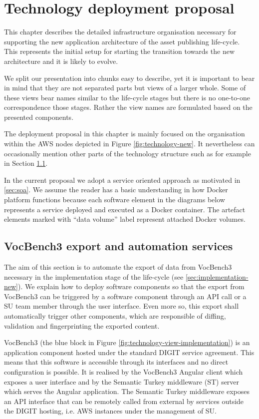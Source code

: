 \chapter{Technology deployment proposal}


	This chapter describes the detailed infrastructure organisation necessary for supporting the new application architecture of the asset publishing life-cycle. This represents the initial setup for starting the transition towards the new architecture and it is likely to evolve. 
	
	We split our presentation into chunks easy to describe, yet it is important to bear in mind that they are not separated parts but views of a larger whole. Some of these views bear names similar to the life-cycle stages but there is no one-to-one correspondence those stages. Rather the view names are formulated based on the presented components.
	
	The deployment proposal in this chapter is mainly focused on the organisation within the AWS nodes depicted in Figure \ref{fig:technology-new}. It nevertheless can occasionally mention other parts of the technology structure such as for example in Section \ref{sec:technology-view-vb3-export}. 
	
	In the current proposal we adopt a service oriented approach as motivated in \ref{sec:soa}. We assume the reader has a basic understanding in how Docker platform \citep{docker} functions because each software element in the diagrams below represents a service deployed and executed as a Docker container. The artefact elements marked with ``data volume'' label represent attached Docker volumes.  

	\section{VocBench3 export and automation services}
	\label{sec:technology-view-vb3-export}
	
	The aim of this section is to automate the export of data from VocBench3 necessary in the implementation stage of the life-cycle (see \ref{sec:implementation-new}).	We explain how to deploy software components so that the export from VocBench3 can be triggered by a software component through an API call or a SU team member through the user interface. Even more so, this export shall automatically trigger other components, which are responsible of diffing, validation and fingerprinting the exported content. 
	
	VocBench3 (the blue block in Figure \ref{fig:technology-view-implementation}) is an application component hosted under the standard DIGIT service agreement. This means that this software is accessible through its interfaces and no direct configuration is possible. It is realised by the VocBench3 Angular client which exposes a user interface and by the Semantic Turkey middleware (ST) server which serves the Angular application. The Semantic Turkey middleware exposes an API interface that can be remotely called from external by services outside the DIGIT hosting, i.e. AWS instances under the management of SU. 
	

